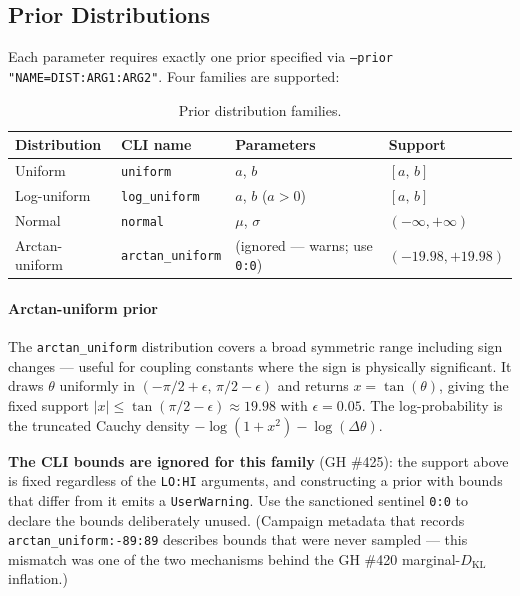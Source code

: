 \subsection{Prior Distributions}
\label{sec:inference-priors}

Each parameter requires exactly one prior specified via
\texttt{--prior "NAME=DIST:ARG1:ARG2"}.  Four families are supported:

\begin{table}[htbp]
\centering
\caption{Prior distribution families.}
\label{tab:priors}
\begin{tabular}{@{}llll@{}}
\toprule
Distribution & CLI name & Parameters & Support \\
\midrule
Uniform              & \texttt{uniform}         & $a$, $b$     & $[a,\, b]$ \\
Log-uniform          & \texttt{log\_uniform}    & $a$, $b$ ($a>0$) & $[a,\, b]$ \\
Normal               & \texttt{normal}          & $\mu$, $\sigma$  & $(-\infty,+\infty)$ \\
Arctan-uniform       & \texttt{arctan\_uniform} & (ignored --- warns; use \texttt{0:0}) & $(-19.98,+19.98)$ \\
\bottomrule
\end{tabular}
\end{table}

\paragraph{Arctan-uniform prior}
The \texttt{arctan\_uniform} distribution covers a broad symmetric range
including sign changes --- useful for coupling constants where the sign is
physically significant.  It draws $\theta$ uniformly in
$(-\pi/2 + \epsilon,\, \pi/2 - \epsilon)$ and returns $x = \tan(\theta)$,
giving the fixed support $|x| \le \tan(\pi/2 - \epsilon) \approx 19.98$ with
$\epsilon = 0.05$.  The log-probability is the truncated Cauchy density
$-\log(1+x^2) - \log(\Delta\theta)$.

\textbf{The CLI bounds are ignored for this family} (GH \#425): the support
above is fixed regardless of the \texttt{LO:HI} arguments, and constructing
a prior with bounds that differ from it emits a \texttt{UserWarning}.  Use
the sanctioned sentinel \texttt{0:0} to declare the bounds deliberately
unused.  (Campaign metadata that records \texttt{arctan\_uniform:-89:89}
describes bounds that were never sampled --- this mismatch was one of the
two mechanisms behind the GH \#420 marginal-$D_\mathrm{KL}$ inflation.)

